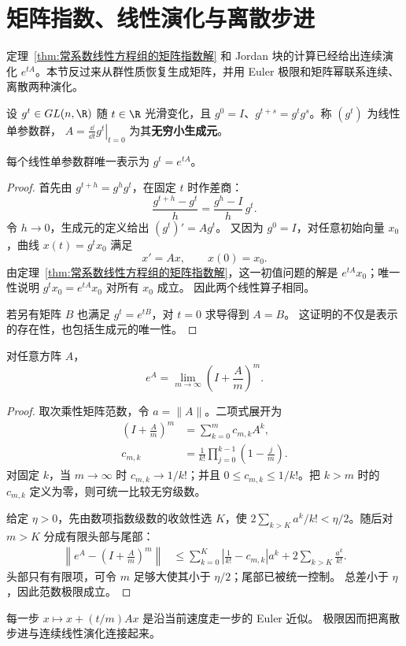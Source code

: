 \section{矩阵指数、线性演化与离散步进}\label{sec:linear-evolution}
定理~\ref{thm:常系数线性方程组的矩阵指数解} 和 Jordan 块的计算已经给出连续演化 $e^{tA}$。本节反过来从群性质恢复生成矩阵，并用 Euler 极限和矩阵幂联系连续、离散两种演化。
\begin{definition}[线性单参数群]
设 $g^t\in GL(n,\R)$ 随 $t\in\R$ 光滑变化，且
$g^0=I$、$g^{t+s}=g^tg^s$。称 $(g^t)$ 为线性单参数群，
$A=\left.\frac{\dd}{\dd t}g^t\right|_{t=0}$ 为其\textbf{无穷小生成元}。
\end{definition}
\begin{theorem}
每个线性单参数群唯一表示为 $g^t=e^{tA}$。
\end{theorem}
\begin{proof}
首先由 $g^{t+h}=g^hg^t$，在固定 $t$ 时作差商：
\[
 \frac{g^{t+h}-g^t}{h}=\frac{g^h-I}{h}\,g^t.
\]
令 $h\to0$，生成元的定义给出 $(g^t)'=Ag^t$。
又因为 $g^0=I$，对任意初始向量 $x_0$，曲线 $x(t)=g^tx_0$ 满足
\[
 x'=Ax,\qquad x(0)=x_0.
\]
由定理~\ref{thm:常系数线性方程组的矩阵指数解}，这一初值问题的解是
$e^{tA}x_0$；唯一性说明 $g^tx_0=e^{tA}x_0$ 对所有 $x_0$ 成立。
因此两个线性算子相同。

若另有矩阵 $B$ 也满足 $g^t=e^{tB}$，对 $t=0$ 求导得到 $A=B$。
这证明的不仅是表示的存在性，也包括生成元的唯一性。
\end{proof}

\begin{theorem}[Euler 极限]
对任意方阵 $A$，
\[
 e^A=\lim_{m\to\infty}\left(I+\frac Am\right)^m.
\]
\end{theorem}
\begin{proof}
取次乘性矩阵范数，令 $a=\|A\|$。二项式展开为
\[
 \begin{aligned}
 \left(I+\frac Am\right)^m&=\sum_{k=0}^m c_{m,k}A^k,\\
 c_{m,k}&=\frac1{k!}\prod_{j=0}^{k-1}\left(1-\frac jm\right).
\end{aligned}
\]
对固定 $k$，当 $m\to\infty$ 时 $c_{m,k}\to1/k!$；并且
$0\leq c_{m,k}\leq1/k!$。把 $k>m$ 时的 $c_{m,k}$ 定义为零，则可统一比较无穷级数。

给定 $\eta>0$，先由数项指数级数的收敛性选 $K$，使
$2\sum_{k>K}a^k/k!<\eta/2$。随后对 $m>K$ 分成有限头部与尾部：
\begin{align*}
 \left\|e^A-\left(I+\frac Am\right)^m\right\|
 &\leq\sum_{k=0}^K\left|\frac1{k!}-c_{m,k}\right|a^k
       +2\sum_{k>K}\frac{a^k}{k!}.
\end{align*}
头部只有有限项，可令 $m$ 足够大使其小于 $\eta/2$；尾部已被统一控制。
总差小于 $\eta$，因此范数极限成立。
\end{proof}
每一步 $x\mapsto x+(t/m)Ax$ 是沿当前速度走一步的 Euler 近似。
极限因而把离散步进与连续线性演化连接起来。

